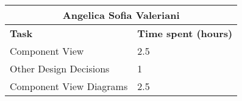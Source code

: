 \begin{table}[ht]
  \center
  \begin{tabular}{l|l}
    \multicolumn{2}{c}{\textbf{Angelica Sofia Valeriani}} \\
    \hline
    \textbf{Task} & \textbf{Time spent (hours)}\\
    \hline
    Component View & 2.5 \\
    Other Design Decisions & 1 \\
    Component View Diagrams & 2.5 \\
  \end{tabular}
\end{table}